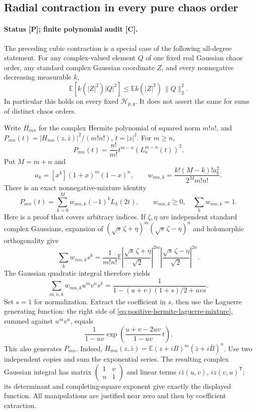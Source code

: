 \subsection{Radial contraction in every pure chaos order}
\paragraph{Status [P]; finite polynomial audit [C].}
The preceding cubic contraction is a special case of the following
all-degree statement. For any complex-valued element $Q$ of one fixed
real Gaussian chaos order, any standard complex Gaussian coordinate $Z$,
and every nonnegative decreasing measurable $k$,
\begin{equation}
 \boxed{\mathbb E[k(|Z|^2)|Q|^2]\le
 \mathbb E k(|Z|^2)\,\|Q\|_2^2.}
 \label{eq:all-degrees-radial}
\end{equation}
In particular this holds on every fixed $\mathcal H_{p,q}$.
It does not assert the same for sums of distinct chaos orders.

Write $H_{mn}$ for the complex Hermite polynomial of squared norm $m!n!$,
and $P_{mn}(t)=|H_{mn}(z,\bar z)|^2/(m!n!)$, $t=|z|^2$.
For $m\ge n$,
\[
 P_{mn}(t)=\frac{n!}{m!}t^{m-n}(L_n^{m-n}(t))^2.
\]
Put $M=m+n$ and
\[
 a_k=[x^k](1+x)^m(1-x)^n,\qquad
 w_{mn,k}=\frac{k!(M-k)!a_k^2}{2^Mm!n!}.
\]
There is an exact nonnegative-mixture identity
\begin{equation}
 P_{mn}(t)=\sum_{k=0}^M w_{mn,k}(-1)^kL_k(2t),\qquad
 w_{mn,k}\ge0,\quad\sum_k w_{mn,k}=1.
 \label{eq:positive-hermite-laguerre-mixture}
\end{equation}
Here is a proof that covers arbitrary indices. If $\zeta,\eta$ are
independent standard complex Gaussians, expansion of
$(\sqrt s\,\zeta+\eta)^m(\sqrt s\,\zeta-\eta)^n$ and holomorphic
orthogonality give
\[
 \sum_k w_{mn,k}s^k
 =\frac1{m!n!}\mathbb E
 \left|\frac{\sqrt s\,\zeta+\eta}{\sqrt2}\right|^{2m}
 \left|\frac{\sqrt s\,\zeta-\eta}{\sqrt2}\right|^{2n}.
\]
The Gaussian quadratic integral therefore yields
\[
 \sum_{m,n,k}w_{mn,k}u^mv^ns^k
 =\frac1{1-(u+v)(1+s)/2+uvs}.
\]
Set $s=1$ for normalization. Extract the coefficient in $s$, then use
the Laguerre generating function: the right side of
\eqref{eq:positive-hermite-laguerre-mixture}, summed against $u^mv^n$,
equals
\[
 \frac1{1-uv}\exp\left(\frac{u+v-2uv}{1-uv}\,t\right).
\]
This also generates $P_{mn}$. Indeed,
$H_{mn}(z,\bar z)=\mathbb E(z+iB)^m(\bar z+i\bar B)^n$.
Use two independent copies and sum the exponential series. The resulting
complex Gaussian integral has matrix
$\left(\begin{smallmatrix}1&v\\u&1\end{smallmatrix}\right)$
and linear terms $i\bar z(u,v)$, $iz(v,u)^{\mathsf T}$; its determinant
and completing-square exponent give exactly the displayed function.
All manipulations are justified near zero and then by coefficient
extraction.

